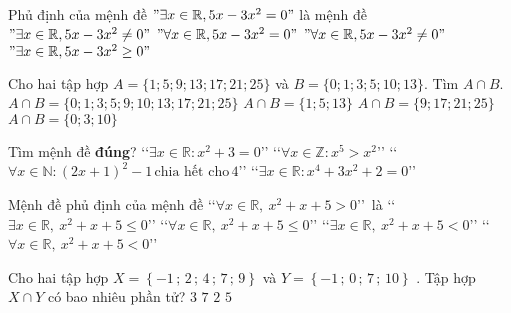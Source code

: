 \begin{ex}%
Phủ định của mệnh đề $"\exists x\in \mathbb{R},5x-3x^2=0"$ là mệnh đề
\choice
{ $"\exists x\in \mathbb{R},5x-3x^2\ne 0"$}
{ $"\forall x\in \mathbb{R},5x-3x^2=0"$}
{\True $"\forall x\in \mathbb{R},5x-3x^2\ne 0"$}
{ $"\exists x\in \mathbb{R},5x-3x^2\ge 0"$}
\end{ex}

\begin{ex}%
Cho hai tập hợp $ A=\{1;5;9;13;17;21;25\} $  và $ B=\{0;1;3;5;10;13\} $. Tìm  $ A\cap B $.
\choice
{$ A\cap B =\{0;1;3;5;9;10;13;17;21;25\}$}
{\True $ A\cap B =\{1;5;13\}$}
{$ A\cap B =\{9;17;21;25\}$}
{$ A\cap B =\{0;3;10\}$}
\end{ex}

\begin{ex}%
Tìm mệnh đề \textbf{đúng}?
\choice
{\lq\lq $\exists x\in\mathbb{R}\colon x^2+3=0$\rq\rq}
{\lq\lq $\forall x\in\mathbb{Z}\colon x^5>x^2$\rq\rq}
{\True \lq\lq $\forall x\in\mathbb{N}\colon (2x+1)^2-1\, \text{chia hết cho}\, 4$\rq\rq}
{\lq\lq $\exists x\in\mathbb{R}\colon x^4+3x^2+2=0$\rq\rq}
\end{ex}


\begin{ex}%
Mệnh đề phủ định của mệnh đề \lq\lq  $\forall x\in \mathbb{R}, \ x^2+x+5>0$\rq\rq \ là
\choice
{\True \lq\lq $\exists x\in \mathbb{R},\ x^2+x+5\le 0$\rq\rq }
{\lq\lq $\forall x\in \mathbb{R},\ x^2 +x+5\le 0$\rq\rq}
{\lq\lq $\exists x\in \mathbb{R},\ x^2+x+5<0$\rq\rq	}
{\lq\lq $\forall x\in \mathbb{R},\ x^2+x+5<0$\rq\rq}

\end{ex}


\begin{ex} %
Cho hai tập hợp $X = \left\{ { - 1\,;\,2\,;\,4\,;\,7\,;\,9} \right\}$  và $Y = \left\{ { - 1\,;\,0\,;\,7\,;\,10} \right\}$  . Tập hợp $X \cap Y$  có bao
nhiêu phần tử?
\choice
{ $ 3 $ }
{ $ 7 $ }
{\True $ 2 $ }
{ $ 5 $ }
\end{ex}

